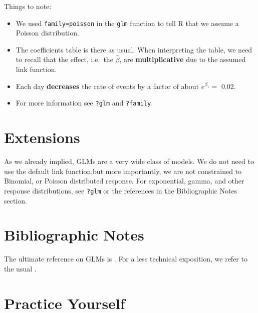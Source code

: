 \documentclass[]{book}
\providecommand{\tightlist}{%
  \setlength{\itemsep}{0pt}\setlength{\parskip}{0pt}}
\theoremstyle{definition}
\theoremstyle{definition}
\theoremstyle{definition}
\theoremstyle{remark}
\begin{document}
Things to note:

\begin{itemize}
\tightlist
\item
  We used \texttt{family=poisson} in the \texttt{glm} function to tell R
  that we assume a Poisson distribution.
\item
  The coefficients table is there as usual. When interpreting the table,
  we need to recall that the effect, i.e.~the \(\hat \beta\), are
  \textbf{multiplicative} due to the assumed link function.
\item
  Each day \textbf{decreases} the rate of events by a factor of about
  \(e^{\beta_1}=\) 0.02.
\item
  For more information see \texttt{?glm} and \texttt{?family}.
\end{itemize}

\section{Extensions}\label{extensions}

As we already implied, GLMs are a very wide class of models. We do not
need to use the default link function,but more importantly, we are not
constrained to Binomial, or Poisson distributed response. For
exponential, gamma, and other response distributions, see \texttt{?glm}
or the references in the Bibliographic Notes section.

\section{Bibliographic Notes}\label{bibliographic-notes-4}

The ultimate reference on GLMs is \citet{mccullagh1984generalized}. For
a less technical exposition, we refer to the usual
\citet{venables2013modern}.

\section{Practice Yourself}\label{practice-glm}
\end{document}
